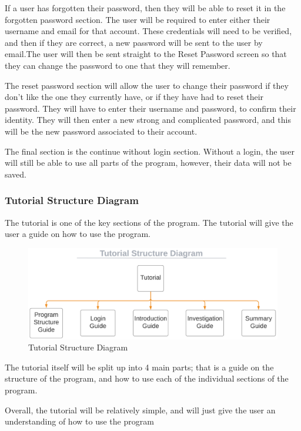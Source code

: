 \documentclass[12pt]{article}
\begin{document}
If a user has forgotten their password, then they will be able to reset it in the forgotten password section. The user will be required to enter either their username and email for that account. These credentials will need to be verified, and then if they are correct, a new password will be sent to the user by email.The user will then be sent straight to the Reset Password screen so that they can change the password to one that they will remember.

The reset password section will allow the user to change their password if they don't like the one they currently have, or if they have had to reset their password. They will have to enter their username and password, to confirm their identity. They will then enter a new strong and complicated password, and this will be the new password associated to their account.

The final section is the continue without login section. Without a login, the user will still be able to use all parts of the program, however, their data will not be saved.

\subsubsection{Tutorial Structure Diagram}

The tutorial is one of the key sections of the program. The tutorial will give the user a guide on how to use the program.

\begin{figure}[h]
    \centering
    \captionsetup{justification=centering}
    \includegraphics[scale=0.55]{tutorial-structure-diagram}
    \caption{Tutorial Structure Diagram}
\end{figure}

The tutorial itself will be split up into 4 main parts; that is a guide on the structure of the program, and how to use each of the individual sections of the program.

Overall, the tutorial will be relatively simple, and will just give the user an understanding of how to use the program
\end{document}
